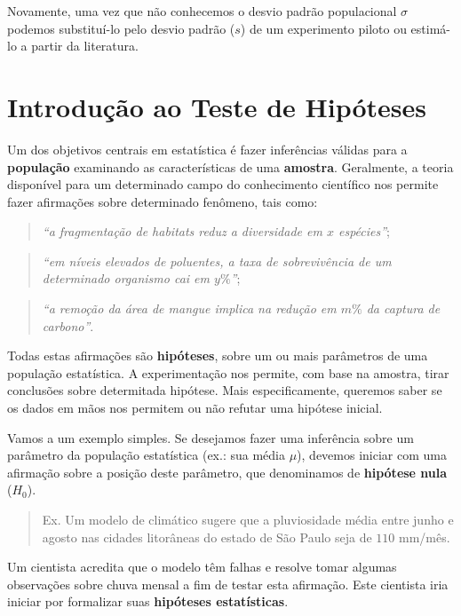 \documentclass[
]{book}
\begin{document}
Novamente, uma vez que não conhecemos o desvio padrão populacional \(\sigma\) podemos substituí-lo pelo desvio padrão (\(s\)) de um experimento piloto ou estimá-lo a partir da literatura.

\hypertarget{th}{%
\chapter{Introdução ao Teste de Hipóteses}\label{th}}

Um dos objetivos centrais em estatística é fazer inferências válidas para a \textbf{população} examinando as características de uma \textbf{amostra}. Geralmente, a teoria disponível para um determinado campo do conhecimento científico nos permite fazer afirmações sobre determinado fenômeno, tais como:

\begin{quote}
\emph{``a fragmentação de habitats reduz a diversidade em \(x\) espécies''};
\end{quote}

\begin{quote}
\emph{``em níveis elevados de poluentes, a taxa de sobrevivência de um determinado organismo cai em \(y\%\)''};
\end{quote}

\begin{quote}
\emph{``a remoção da área de mangue implica na redução em \(m\%\) da captura de carbono''}.
\end{quote}

Todas estas afirmações são \textbf{hipóteses}, sobre um ou mais parâmetros de uma população estatística. A experimentação nos permite, com base na amostra, tirar conclusões sobre determitada hipótese. Mais especificamente, queremos saber se os dados em mãos nos permitem ou não refutar uma hipótese inicial.

Vamos a um exemplo simples. Se desejamos fazer uma inferência sobre um parâmetro da população estatística (ex.: sua média \(\mu\)), devemos iniciar com uma afirmação sobre a posição deste parâmetro, que denominamos de \textbf{hipótese nula} (\(H_0\)).

\begin{quote}
Ex. Um modelo de climático sugere que a pluviosidade média entre junho e agosto nas cidades litorâneas do estado de São Paulo seja de \(110\) mm/mês.
\end{quote}

Um cientista acredita que o modelo têm falhas e resolve tomar algumas observações sobre chuva mensal a fim de testar esta afirmação. Este cientista iria iniciar por formalizar suas \textbf{hipóteses estatísticas}.
\end{document}
